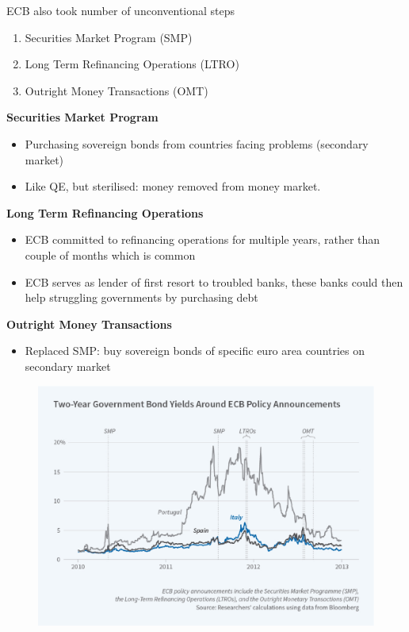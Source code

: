 \documentclass{beamer}
\begin{document}
\begin{frame}
  ECB also took number of unconventional steps
  \begin{enumerate}    
    \item Securities Market Program (SMP)
    \item Long Term Refinancing Operations (LTRO)
    \item Outright Money Transactions (OMT) 
  \end{enumerate}
\end{frame}

\begin{frame}
  \textbf{Securities Market Program}
  \begin{itemize}
    \item Purchasing sovereign bonds from countries facing problems (secondary market)
    \item Like QE, but sterilised: money removed from money market.
  \end{itemize}
  \medskip
  \textbf{Long Term Refinancing Operations}
  \begin{itemize}
    \item ECB committed to refinancing operations for multiple years, rather than couple of months which is common    
    \item ECB serves as lender of first resort to troubled banks, these banks could then help struggling governments by purchasing debt    
  \end{itemize}
  \medskip  
  \textbf{Outright Money Transactions}
  \begin{itemize}
    \item Replaced SMP: buy sovereign bonds of specific euro area countries on secondary market     
  \end{itemize}
\end{frame}

\begin{frame}
  \begin{figure}
    \includegraphics[scale=.4]{ecb.eps}
  \end{figure}
\end{frame}
\end{document}
